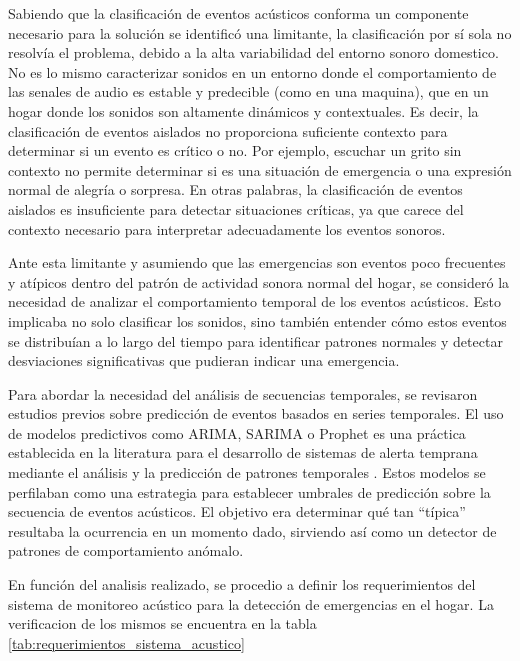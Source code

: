 Sabiendo que la clasificación de eventos acústicos conforma un componente necesario para la solución se identificó una limitante, la clasificación por sí sola no resolvía el problema, debido a la alta variabilidad del entorno sonoro domestico. No es lo mismo caracterizar sonidos en un entorno donde el comportamiento de las senales de audio es estable y predecible (como en una maquina), que en un hogar donde los sonidos son altamente dinámicos y contextuales. Es decir, la clasificación de eventos aislados no proporciona suficiente contexto para determinar si un evento es crítico o no. Por ejemplo, escuchar un grito sin contexto no permite determinar si es una situación de emergencia o una expresión normal de alegría o sorpresa. En otras palabras, la clasificación de eventos aislados es insuficiente para detectar situaciones críticas, ya que carece del contexto necesario para interpretar adecuadamente los eventos sonoros.

Ante esta limitante y asumiendo que las emergencias son eventos poco frecuentes y atípicos dentro del patrón de actividad sonora normal del hogar, se consideró la necesidad de analizar el comportamiento temporal de los eventos acústicos. Esto implicaba no solo clasificar los sonidos, sino también entender cómo estos eventos se distribuían a lo largo del tiempo para identificar patrones normales y detectar desviaciones significativas que pudieran indicar una emergencia.

Para abordar la necesidad del análisis de secuencias temporales, se revisaron estudios previos sobre predicción de eventos basados en series temporales. El uso de modelos predictivos como ARIMA, SARIMA o Prophet es una práctica establecida en la literatura para el desarrollo de sistemas de alerta temprana mediante el análisis y la predicción de patrones temporales \citeauthor{mora2023analisis} \citeyear{mora2023analisis}. Estos modelos se perfilaban como una estrategia para establecer umbrales de predicción sobre la secuencia de eventos acústicos. El objetivo era determinar qué tan ``típica'' resultaba la ocurrencia en un momento dado, sirviendo así como un detector de patrones de comportamiento anómalo.

En función del analisis realizado, se procedio a definir los requerimientos del sistema de monitoreo acústico para la detección de emergencias en el hogar. La verificacion de los mismos se encuentra en la tabla \ref{tab:requerimientos_sistema_acustico}


